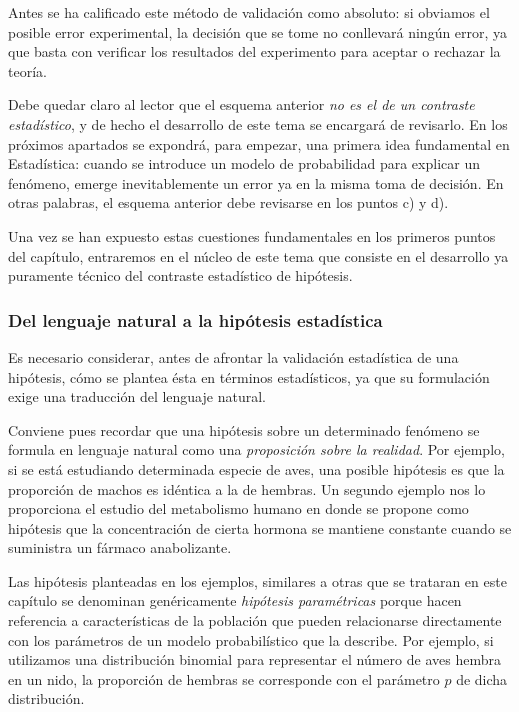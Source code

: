 \documentclass[
]{article}
\begin{document}
Antes se ha calificado este método de validación como absoluto: si obviamos el posible error experimental, la decisión que se tome no conllevará ningún error, ya que basta con verificar los resultados del experimento para aceptar o rechazar la teoría.

Debe quedar claro al lector que el esquema anterior \emph{no es el de un contraste estadístico}, y de hecho el desarrollo de este tema se encargará de revisarlo. En los próximos apartados se expondrá, para empezar, una primera idea fundamental en Estadística: cuando se introduce un modelo de probabilidad para explicar un fenómeno, emerge inevitablemente un error ya en la misma toma de decisión. En otras palabras, el esquema anterior debe revisarse en los puntos c) y d).

Una vez se han expuesto estas cuestiones fundamentales en los primeros puntos del capítulo, entraremos en el núcleo de este tema que consiste en el desarrollo ya puramente técnico del contraste estadístico de hipótesis.

\subsubsection{Del lenguaje natural a la hipótesis estadística}\label{del-lenguaje-natural-a-la-hipuxf3tesis-estaduxedstica}

Es necesario considerar, antes de afrontar la validación estadística de una hipótesis, cómo se plantea ésta en términos estadísticos, ya que su formulación exige una traducción del lenguaje natural.

Conviene pues recordar que una hipótesis sobre un determinado fenómeno se formula en lenguaje natural como una \emph{proposición sobre la realidad}. Por ejemplo, si se está estudiando determinada especie de aves, una posible hipótesis es que la proporción de machos es idéntica a la de hembras. Un segundo ejemplo nos lo proporciona el estudio del metabolismo humano en donde se propone como hipótesis que la concentración de cierta hormona se mantiene constante cuando se suministra un fármaco anabolizante.

Las hipótesis planteadas en los ejemplos, similares a otras que se trataran en este capítulo se denominan genéricamente \emph{hipótesis paramétricas} porque hacen referencia a características de la población que pueden relacionarse directamente con los parámetros de un modelo probabilístico que la describe. Por ejemplo, si utilizamos una distribución binomial para representar el número de aves hembra en un nido, la proporción de hembras se corresponde con el parámetro \(p\) de dicha distribución.
\end{document}
